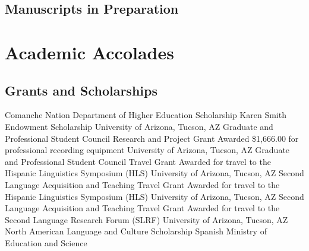 \documentclass[12pt,letterpaper]{moderncv}
\begin{document}
\subsection{Manuscripts in Preparation}















\section{Academic Accolades}

\subsection{Grants and Scholarships}

        {Comanche Nation Department of Higher Education Scholarship}
        {}
        {}
        {}
        {}
        {}
        {Karen Smith Endowment Scholarship}
        {}
        {}
        {}
        {University of Arizona, Tucson, AZ}
        {Graduate and Professional Student Council Research and Project Grant}
        {\newline Awarded \$1,666.00 for professional recording equipment}
        {}
        {}
        {University of Arizona, Tucson, AZ}
        {Graduate and Professional Student Council Travel Grant}
        {\newline Awarded for travel to the Hispanic Linguistics Symposium (HLS)}
        {}
        {}
        {University of Arizona, Tucson, AZ}
        {Second Language Acquisition and Teaching Travel Grant}
        {\newline Awarded for travel to the Hispanic Linguistics Symposium (HLS)}
        {}
        {}
        {University of Arizona, Tucson, AZ}
        {Second Language Acquisition and Teaching Travel Grant}
        {\newline Awarded for travel to the Second Language Research Forum (SLRF)}
        {}
        {}
        {University of Arizona, Tucson, AZ}
        {North American Language and Culture Scholarship}
        {}
        {}
        {}
        {Spanish Ministry of Education and Science}
\end{document}

